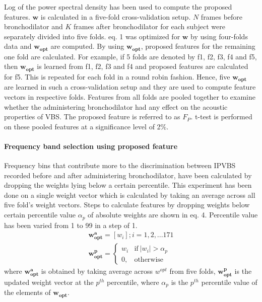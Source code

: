\documentclass{article}
\begin{document}
Log of the power spectral density has been used to compute the proposed features. \(\boldsymbol{w}\) is calculated in a five-fold cross-validation setup. \(N\) frames before bronchodilator and \(K\) frames after bronchodilator for each subject were separately divided into five folds. eq. 1 was optimized for $\boldsymbol{w}$ by using four-folds data and \(\boldsymbol{w_{opt}}\) are computed. By using \(\boldsymbol{w_{opt}}\), proposed features for the remaining one fold are calculated. For example, if 5 folds are denoted by f1, f2, f3, f4 and f5, then \(\boldsymbol{w_{opt}}\) is learned from f1, f2, f3 and f4 and proposed features are calculated for f5. This is repeated for each fold in a round robin fashion. Hence, five \(\boldsymbol{w_{opt}}\) are learned in such a cross-validation setup and they are used to compute feature vectors in respective folds. Features from all folds are pooled together to examine whether the administering bronchodilator had any effect on the acoustic properties of VBS. The proposed feature is referred to as $F_{P}$. t-test is performed on these pooled features at a significance level of 2\%. 

\paragraph{Frequency band selection using proposed feature}

Frequency bins that contribute more to the discrimination between IPVBS recorded before and after administering bronchodilator, have been calculated by dropping the weights lying below a certain percentile. This experiment has been done on a single weight vector which is calculated by taking an average across all five fold's weight vectors. Steps to calculate features by dropping weights below certain percentile value $\alpha_p$ of absolute weights are shown in eq. 4. Percentile value has been varied from 1 to 99 in a step of 1.
\\
\begin{equation}
\begin{aligned}
\boldsymbol{w_{opt}^a}=[w_{i}]; i=1,2,...171\\
\boldsymbol{w_{opt}^p} =
\begin{cases}
w_i & \text{if}\  \lvert w_i \lvert>\alpha_{p}\\ 
0, & \text{otherwise}
\end{cases}
\end{aligned}
\end{equation}
where $\boldsymbol{w_{opt}^a}$ is obtained by taking average across $w^{opt}$ from five folds, $\boldsymbol{w_{opt}^p}$ is the updated weight vector at the $p^{th}$ percentile, where $\alpha_{p}$ is the $p^{th}$ percentile value of the elements of  $\boldsymbol{w_{opt}}$.
\end{document}
